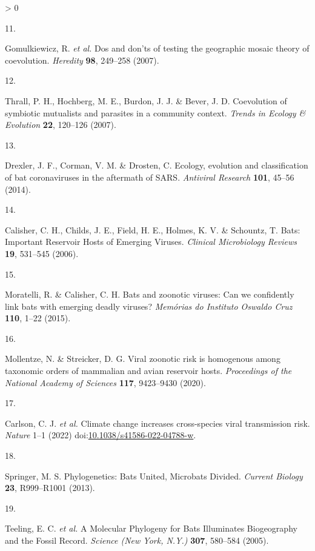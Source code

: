 \documentclass[10pt,oneside]{article}
\newlength{\cslhangindent}
\newlength{\csllabelwidth}
\newenvironment{CSLReferences}[3] %
 {%
  \setlength{\parindent}{0pt}
  \ifodd #1 \everypar{\setlength{\hangindent}{\cslhangindent}}\ignorespaces\fi
  \ifnum #2 > 0
  \setlength{\parskip}{#2\baselineskip}
  \fi
 }%
 {}
\newcommand{\CSLLeftMargin}[1]{\parbox[t]{\maxof{\widthof{#1}}{\csllabelwidth}}{#1}}
\newcommand{\CSLRightInline}[1]{\parbox[t]{\linewidth}{#1}}
\begin{document}
\begin{CSLReferences}{0}{0}
\leavevmode\hypertarget{ref-Gomulkiewicz2007DosDon}{}%
\CSLLeftMargin{11. }
\CSLRightInline{Gomulkiewicz, R. \emph{et al.} Dos and don'ts of testing
the geographic mosaic theory of coevolution. \emph{Heredity}
\textbf{98}, 249--258 (2007).}

\leavevmode\hypertarget{ref-Thrall2007CoeSym}{}%
\CSLLeftMargin{12. }
\CSLRightInline{Thrall, P. H., Hochberg, M. E., Burdon, J. J. \& Bever,
J. D. Coevolution of symbiotic mutualists and parasites in a community
context. \emph{Trends in Ecology \& Evolution} \textbf{22}, 120--126
(2007).}

\leavevmode\hypertarget{ref-Drexler2014EcoEvo}{}%
\CSLLeftMargin{13. }
\CSLRightInline{Drexler, J. F., Corman, V. M. \& Drosten, C. Ecology,
evolution and classification of bat coronaviruses in the aftermath of
SARS. \emph{Antiviral Research} \textbf{101}, 45--56 (2014).}

\leavevmode\hypertarget{ref-Calisher2006BatImp}{}%
\CSLLeftMargin{14. }
\CSLRightInline{Calisher, C. H., Childs, J. E., Field, H. E., Holmes, K.
V. \& Schountz, T. Bats: Important Reservoir Hosts of Emerging Viruses.
\emph{Clinical Microbiology Reviews} \textbf{19}, 531--545 (2006).}

\leavevmode\hypertarget{ref-Moratelli2015BatZoo}{}%
\CSLLeftMargin{15. }
\CSLRightInline{Moratelli, R. \& Calisher, C. H. Bats and zoonotic
viruses: Can we confidently link bats with emerging deadly viruses?
\emph{Memórias do Instituto Oswaldo Cruz} \textbf{110}, 1--22 (2015).}

\leavevmode\hypertarget{ref-Mollentze2020VirZoo}{}%
\CSLLeftMargin{16. }
\CSLRightInline{Mollentze, N. \& Streicker, D. G. Viral zoonotic risk is
homogenous among taxonomic orders of mammalian and avian reservoir
hosts. \emph{Proceedings of the National Academy of Sciences}
\textbf{117}, 9423--9430 (2020).}

\leavevmode\hypertarget{ref-Carlson2022CliCha}{}%
\CSLLeftMargin{17. }
\CSLRightInline{Carlson, C. J. \emph{et al.} Climate change increases
cross-species viral transmission risk. \emph{Nature} 1--1 (2022)
doi:\href{https://doi.org/10.1038/s41586-022-04788-w}{10.1038/s41586-022-04788-w}.}

\leavevmode\hypertarget{ref-Springer2013PhyBat}{}%
\CSLLeftMargin{18. }
\CSLRightInline{Springer, M. S. Phylogenetics: Bats United, Microbats
Divided. \emph{Current Biology} \textbf{23}, R999--R1001 (2013).}

\leavevmode\hypertarget{ref-Teeling2005MolPhy}{}%
\CSLLeftMargin{19. }
\CSLRightInline{Teeling, E. C. \emph{et al.} A Molecular Phylogeny for
Bats Illuminates Biogeography and the Fossil Record. \emph{Science (New
York, N.Y.)} \textbf{307}, 580--584 (2005).}


\end{CSLReferences}
\end{document}
